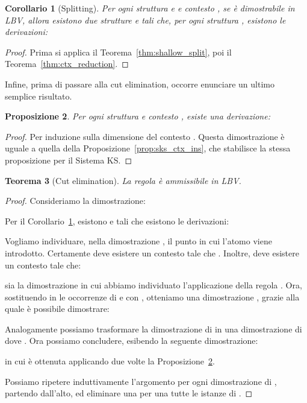 \documentclass[12pt,a4paper,openright,twoside]{report}
\newtheorem{thm}{Teorema}[section]
\newtheorem{cor}[thm]{Corollario}
\newtheorem{prop}[thm]{Proposizione}
\begin{document}
\begin{cor}[Splitting]\label{cor:splitting}
Per ogni struttura  e  e contesto , se  \`e dimostrabile in \textsf{LBV}, allora esistono due strutture  e  tali che, per ogni struttura , esistono le derivazioni:

\end{cor}
\begin{proof}
Prima si applica il Teorema~\ref{thm:shallow_split}, poi il Teorema~\ref{thm:ctx_reduction}.
\end{proof}

Infine, prima di passare alla cut elimination, occorre enunciare un ultimo semplice risultato.

\begin{prop}\label{prop:lbv_ctx_ins}
Per ogni struttura  e contesto , esiste una derivazione:

\end{prop}
\begin{proof}
Per induzione sulla dimensione del contesto . Questa dimostrazione \`e uguale a quella della Proposizione~\ref{prop:sks_ctx_ins}, che stabilisce la stessa proposizione per il Sistema \textsf{KS}.
\end{proof}

\begin{thm}[Cut elimination]
La regola  \`e ammissibile in \textsf{LBV}.
\end{thm}
\begin{proof}
Consideriamo la dimostrazione:

Per il Corollario~\ref{cor:splitting}, esistono  e  tali che esistono le derivazioni:

Vogliamo individuare, nella dimostrazione , il punto in cui l'atomo  viene introdotto. Certamente deve esistere un contesto  tale che . Inoltre, deve esistere un contesto  tale che:

sia la dimostrazione  in cui abbiamo individuato l'applicazione della regola . Ora, sostituendo in  le occorrenze di  e  con , otteniamo una dimostrazione , grazie alla quale \`e possibile dimostrare:

Analogamente possiamo trasformare la dimostrazione di  in una dimostrazione di  dove . Ora possiamo concludere, esibendo la seguente dimostrazione:

in cui  \`e ottenuta applicando due volte la Proposizione~\ref{prop:lbv_ctx_ins}.

Possiamo ripetere induttivamente l'argomento per ogni dimostrazione di , partendo dall'alto, ed eliminare una per una tutte le istanze di .
\end{proof}
\end{document}
